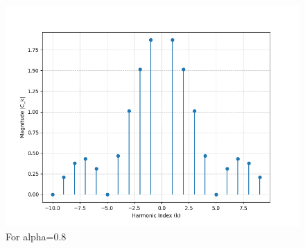 \begin{multicols}{2}
\begin{figure}[H]
  \includegraphics[width=\columnwidth]{sections/1_spectrum3.png}
  \caption{For alpha=0.8}
\end{figure}

\end{multicols}
